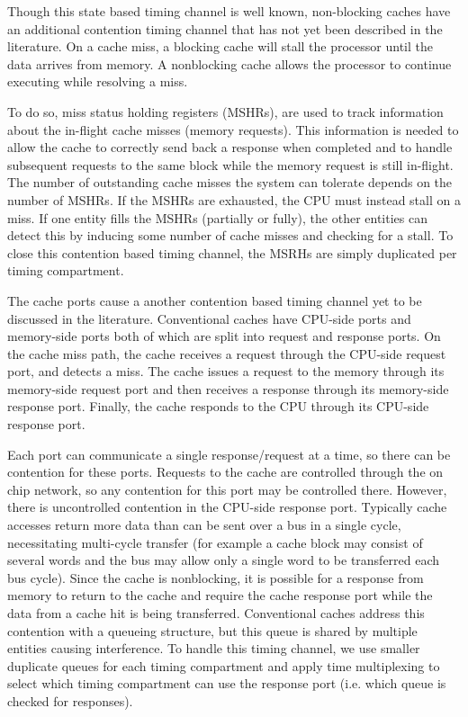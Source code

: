 Though this state based timing channel is well known, non-blocking caches have 
an additional contention timing channel that has not yet been described in the 
literature. On a cache miss, a blocking cache will stall the processor until 
the data arrives from memory. A nonblocking cache allows the processor to 
continue executing while resolving a miss.

To do so, miss status holding registers (MSHRs), are used to track information 
about the in-flight cache misses (memory requests). This information is  needed 
to allow the cache to correctly send back a response when completed and to 
handle subsequent requests to the same block while the memory request is still 
in-flight.
The number of outstanding cache misses the system can tolerate depends on the 
number of MSHRs. If the MSHRs are exhausted, the CPU must instead stall on a 
miss. If one entity fills the MSHRs (partially or fully), the other entities 
can detect this by inducing some number of cache misses and checking for a 
stall. To close this contention based timing channel, the MSRHs are simply 
duplicated per timing compartment.

The cache ports cause a another contention based timing channel yet to be 
discussed in the literature. Conventional caches have CPU-side ports and 
memory-side ports both of which are split into request and response ports. On 
the cache miss path, the cache receives a request through the CPU-side request 
port, and detects a miss. The cache issues a request to the memory through its 
memory-side request port and then receives a response through its memory-side 
response port. Finally, the cache responds to the CPU through its CPU-side 
response port.

Each port can communicate a single response/request at a time, so there can be 
contention for these ports. Requests to the cache are controlled through the on 
chip network, so any contention for this port may be controlled there. However, 
there is uncontrolled contention in the CPU-side response port. Typically cache 
accesses return more data than can be sent over a bus in a single cycle, 
necessitating multi-cycle transfer (for example a cache block may consist of 
several words and the bus may allow only a single word to be transferred each 
bus cycle). Since the cache is nonblocking, it is possible for a response from 
memory to return to the cache and require the cache response port while the 
data from a cache hit is being transferred. Conventional caches address this 
contention with a queueing structure, but this queue is shared by multiple 
entities causing interference. To handle this timing channel, we use smaller 
duplicate queues for each timing compartment and apply time multiplexing to 
select which timing compartment can use the response port (i.e. which queue is 
checked for responses).

